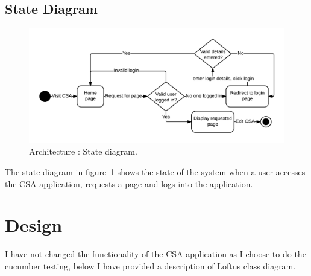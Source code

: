 \documentclass[10pt,a4paper,titlepage]{article}
\begin{document}
\subsection{State Diagram}
\begin{figure}[H]
\begin{center}
\includegraphics[scale=0.25]{include/State_Diagram.png}  
\caption{Architecture : State diagram. }
\label{fig:stateDiagram}
\end{center}
\end{figure}

The state diagram in figure~\ref{fig:stateDiagram} shows the state of the system when a user accesses the CSA application, requests a page and logs into the application. 

\section{Design}
I have not changed the functionality of the CSA application as I choose to do the cucumber testing, below I have provided a description of Loftus \cite[5]{design} class diagram. 
\end{document}
